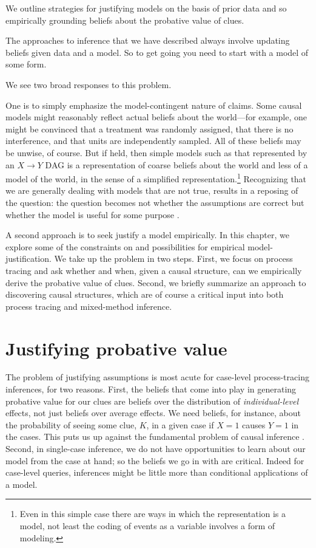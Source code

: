 \documentclass[
  12pt,
]{book}
\newenvironment{headerbox}{
  \definecolor{shadecolor}{rgb}{0.8, 0.8, 0.8}  %
  \color{black}
  \begin{shaded}}{\end{shaded}}
\begin{document}
\begin{headerbox}
We outline strategies for justifying models on the basis of prior data and so empirically grounding beliefs about the probative value of clues.

\end{headerbox}

The approaches to inference that we have described always involve updating beliefs given data and a model. So to get going you need to start with a model of some form.

We see two broad responses to this problem.

One is to simply emphasize the model-contingent nature of claims. Some causal models might reasonably reflect actual beliefs about the world---for example, one might be convinced that a treatment was randomly assigned, that there is no interference, and that units are independently sampled. All of these beliefs may be unwise, of course. But if held, then simple models such as that represented by an \(X \rightarrow Y\) DAG is a representation of coarse beliefs about the world and less of a model of the world, in the sense of a simplified representation.\footnote{Even in this simple case there are ways in which the representation is a model, not least the coding of events as a variable involves a form of modeling.} Recognizing that we are generally dealing with models that are not true, results in a reposing of the question: the question becomes not whether the assumptions are correct but whether the model is useful for some purpose \citep{clarke2012model}.

A second approach is to seek justify a model empirically. In this chapter, we explore some of the constraints on and possibilities for empirical model-justification. We take up the problem in two steps. First, we focus on process tracing and ask whether and when, given a causal structure, can we empirically derive the probative value of clues. Second, we briefly summarize an approach to discovering causal structures, which are of course a critical input into both process tracing and mixed-method inference.

\hypertarget{justifying-probative-value}{%
\section{Justifying probative value}\label{justifying-probative-value}}

The problem of justifying assumptions is most acute for case-level process-tracing inferences, for two reasons. First, the beliefs that come into play in generating probative value for our clues are beliefs over the distribution of \emph{individual-level} effects, not just beliefs over average effects. We need beliefs, for instance, about the probability of seeing some clue, \(K\), in a given case if \(X=1\) causes \(Y=1\) in the cases. This puts us up against the fundamental problem of causal inference \citep{holland1986statistics}. Second, in single-case inference, we do not have opportunities to learn about our model from the case at hand; so the beliefs we go in with are critical. Indeed for case-level queries, inferences might be little more than conditional applications of a model.
\end{document}
